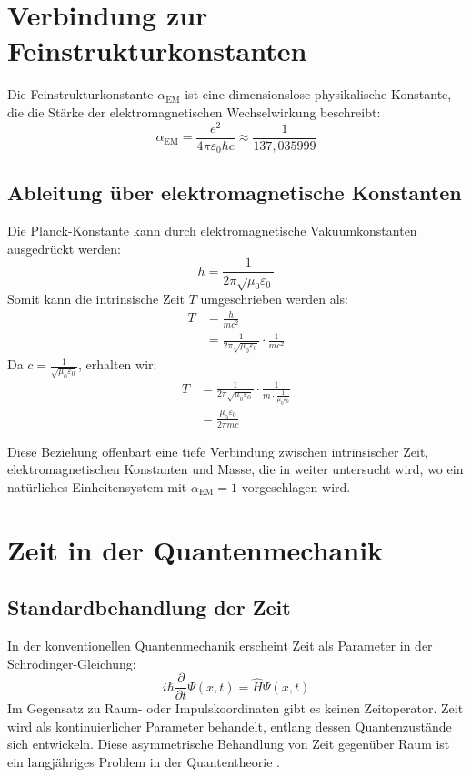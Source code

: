\documentclass[12pt,a4paper]{article}
\newcommand{\alphaEM}{\alpha_{\text{EM}}}
\begin{document}
	\section{Verbindung zur Feinstrukturkonstanten}
	Die Feinstrukturkonstante \( \alphaEM \) ist eine dimensionslose physikalische Konstante, die die Stärke der elektromagnetischen Wechselwirkung beschreibt:
	\begin{equation}
		\alphaEM = \frac{e^2}{4\pi\varepsilon_0\hbar c} \approx \frac{1}{137,035999}
	\end{equation}
	
	\subsection{Ableitung über elektromagnetische Konstanten}
	Die Planck-Konstante kann durch elektromagnetische Vakuumkonstanten ausgedrückt werden:
	\begin{equation}
		h = \frac{1}{2\pi\sqrt{\mu_0\varepsilon_0}}
	\end{equation}
	Somit kann die intrinsische Zeit \( T \) umgeschrieben werden als:
	\begin{align}
		T &= \frac{h}{mc^2} \\
		&= \frac{1}{2\pi\sqrt{\mu_0\varepsilon_0}} \cdot \frac{1}{mc^2}
	\end{align}
	Da \( c = \frac{1}{\sqrt{\mu_0\varepsilon_0}} \), erhalten wir:
	\begin{align}
		T &= \frac{1}{2\pi\sqrt{\mu_0\varepsilon_0}} \cdot \frac{1}{m \cdot \frac{1}{\mu_0\varepsilon_0}} \\
		&= \frac{\mu_0\varepsilon_0}{2\pi m c}
	\end{align}
	
	Diese Beziehung offenbart eine tiefe Verbindung zwischen intrinsischer Zeit, elektromagnetischen Konstanten und Masse, die in \cite{pascher_alpha_2025} weiter untersucht wird, wo ein natürliches Einheitensystem mit \(\alphaEM = 1\) vorgeschlagen wird.
	
	\section{Zeit in der Quantenmechanik}
	\subsection{Standardbehandlung der Zeit}
	In der konventionellen Quantenmechanik erscheint Zeit als Parameter in der Schrödinger-Gleichung:
	\begin{equation}
		i\hbar \frac{\partial}{\partial t}\Psi(x,t) = \hat{H}\Psi(x,t)
	\end{equation}
	Im Gegensatz zu Raum- oder Impulskoordinaten gibt es keinen Zeitoperator. Zeit wird als kontinuierlicher Parameter behandelt, entlang dessen Quantenzustände sich entwickeln. Diese asymmetrische Behandlung von Zeit gegenüber Raum ist ein langjähriges Problem in der Quantentheorie \cite{pascher_erweiterung_2025}.
	
\end{document}
